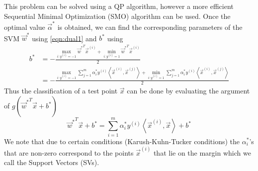 This problem can be solved using a QP algorithm, however a more efficient Sequential Minimal Optimization (SMO) algorithm can be used. Once the optimal value  $\vec\alpha^\ast$ is obtained, we can find the corresponding parameters of the SVM $\vec w^\ast$ using \eqref{eqn:dual1} and $b^\ast$ using
	\begin{align}
		b^\ast 	& = - \frac{\max_{i: y^{(i)} = -1} {\vec w^*}^T \vec x ^{(i)} + \min_{i: y^{(i)} = 1} {\vec w^*}^T \vec x ^{(i)} }{2} \\
				& = - \frac{\max_{i: y^{(i)} = -1} \sum_{j = 1}^{m} \alpha^\ast_i y^{(i)} \left\langle \vec{x}^{(i)}, \vec{x}^{(j)} \right\rangle + \min_{i: y^{(i)} = 1} \sum_{j = 1}^{m} \alpha^\ast_i y^{(i)} \left\langle \vec{x}^{(i)}, \vec{x}^{(j)} \right\rangle }{2} \label{eqn:bStar}
	\end{align}
Thus the classification of a test point $\vec x$ can be done by evaluating the argument of $g({\vec w^\ast}^T \vec x + b^\ast)$
	\begin{equation}
		{\vec w^\ast}^T \vec x + b^\ast = \sum_{i = 1}^{m} \alpha_i^\ast y^{(i)} \left\langle \vec{x}^{(i)}, \vec{x} \right\rangle + b^\ast
		\label{eqn:svmClassifier}
	\end{equation}
We note that due to certain conditions (Karush-Kuhn-Tucker conditions) the $\alpha^\ast_i$'s that are non-zero correspond to the points $\vec x ^{(i)}$ that lie on the margin which we call the Support Vectors (SVs). 

